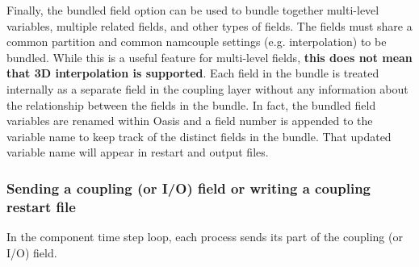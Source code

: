 Finally, the bundled field option can be used to
bundle together multi-level variables, multiple related fields, and other types
of fields.  The fields must share a common partition and common namcouple settings (e.g. interpolation)
to be bundled.  While this is a useful feature for multi-level fields, {\bf this does not mean
that 3D interpolation is supported}.
Each field in the bundle is
treated internally as a separate field in the coupling layer without
any information about the relationship between the fields in the bundle.  In fact,
the bundled field variables are renamed within Oasis and a field number is appended
to the variable name to keep track of the distinct fields in the bundle.  That
updated variable name will appear in restart and output files.


\subsubsection{Sending a coupling (or I/O) field or writing a coupling restart file}
\label{prismput}

In the component time step loop, each process sends its part of the
coupling (or I/O) field.

